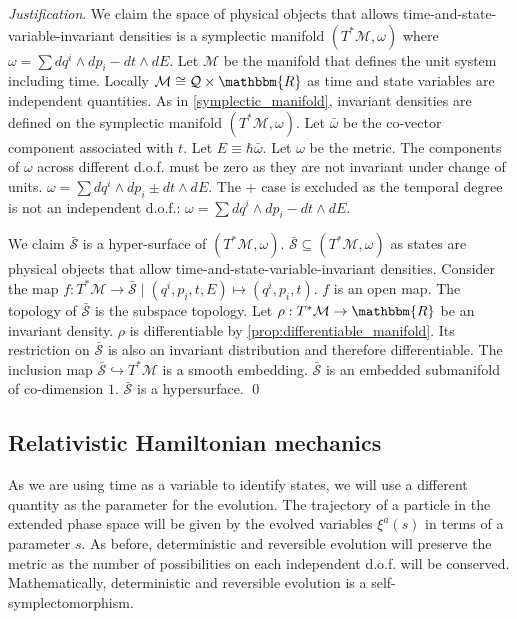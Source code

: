 \documentclass[aps,pra,10pt,twocolumn,floatfix,nofootinbib]{revtex4-1}
\numberwithin{equation}{section}
\theoremstyle{definition}
\newenvironment{justification}{\emph{Justification}.}{\qed}
\begin{document}
\begin{justification}
	We claim the space of physical objects that allows time-and-state-variable-invariant densities is a symplectic manifold $(T^*\mathcal{M}, \omega)$ where $\omega = \sum dq^i \wedge dp_i - dt \wedge dE$. Let $\mathcal{M}$ be the manifold that defines the unit system including time. Locally $\mathcal{M} \cong \mathcal{Q} \times \mathbbm{R}$ as time and state variables are independent quantities. As in \ref{symplectic_manifold}, invariant densities are defined on the symplectic manifold $(T^*\mathcal{M}, \omega)$. Let $\bar{\omega}$ be the co-vector component associated with $t$. Let $E\equiv\hbar \bar{\omega}$. Let $\omega$ be the metric. The components of $\omega$ across different d.o.f. must be zero as they are not invariant under change of units. $\omega=\sum dq^i \wedge dp_i \pm dt \wedge dE$. The $+$ case is excluded as the temporal degree is not an independent d.o.f.: $\omega = \sum dq^i \wedge dp_i - dt \wedge dE$.
	
	We claim $\bar{\mathcal{S}}$ is a hyper-surface of $(T^*\mathcal{M}, \omega)$. $\bar{\mathcal{S}} \subseteq (T^*\mathcal{M}, \omega)$ as states are physical objects that allow time-and-state-variable-invariant densities. Consider the map $f : T^*\mathcal{M} \rightarrow \bar{\mathcal{S}} \; | \; (q^i, p_i, t, E) \mapsto (q^i, p_i, t)$. $f$ is an open map. The topology of $\bar{\mathcal{S}}$ is the subspace topology. Let $\rho : T^*\mathcal{M} \rightarrow \mathbbm{R}$ be an invariant density. $\rho$ is differentiable by \ref{prop:differentiable_manifold}. Its restriction on $\bar{\mathcal{S}}$ is also an invariant distribution and therefore differentiable. The inclusion map $\bar{\mathcal{S}} \hookrightarrow T^*\mathcal{M}$ is a smooth embedding. $\bar{\mathcal{S}}$ is an embedded submanifold of co-dimension $1$. $\bar{\mathcal{S}}$ is a hypersurface.
\end{justification}


\subsection{Relativistic Hamiltonian mechanics}

As we are using time as a variable to identify states, we will use a different quantity as the parameter for the evolution. The trajectory of a particle in the extended phase space will be given by the evolved variables $\xi^a(s)$ in terms of a parameter $s$. As before, deterministic and reversible evolution will preserve the metric as the number of possibilities on each independent d.o.f. will be conserved. Mathematically, deterministic and reversible evolution is a self-symplectomorphism.
\end{document}
